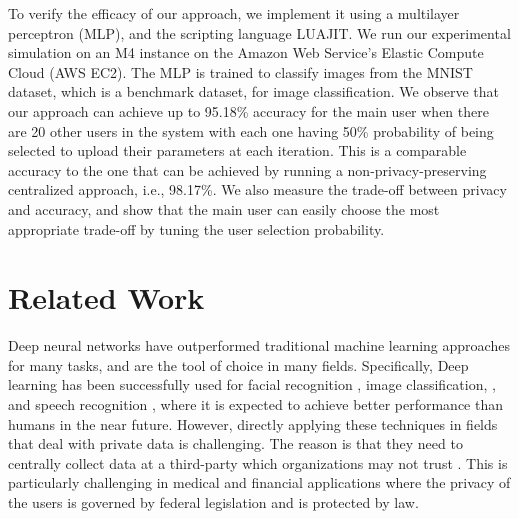 \documentclass[conference]{IEEEtran}
\begin{document}
To verify the efficacy of our approach, we implement it using a multilayer perceptron (MLP), and the scripting language
LUAJIT. We run our experimental simulation on an M4 instance on the Amazon Web Service's Elastic Compute Cloud (AWS EC2). 
The MLP is trained to  classify images from the MNIST dataset, which is a benchmark dataset,  for image classification.
We observe that our approach can achieve up to 95.18\%  accuracy for the main user when there are 20 other users in the
system with each one having 50\% probability of being selected to upload their parameters at each iteration. 
This is a comparable accuracy to the one that can be achieved by running a non-privacy-preserving centralized approach, i.e.,  98.17\%.
We also measure the trade-off between privacy and accuracy, and show that the main user can easily choose the most appropriate
trade-off by tuning the user selection probability. 


\section{Related Work}

Deep neural networks have outperformed traditional machine learning approaches for many tasks, and are the tool of choice in many
fields. Specifically, Deep learning has been successfully used for facial recognition \cite{krizhevsky2012imagenet, sun2014deep, ding2015robust}, image classification, 
\cite{simard2003best, ma2015hyperspectral, zhong2011bilinear}, and speech recognition \cite{hinton2012deep, graves2013speech, noda2015audio}, where it is expected to achieve better
performance than humans in the near future. However, directly applying these techniques in fields that deal with private data is
challenging. The reason is that they need to centrally collect data at a third-party which organizations may not trust
\cite{chicurel2000databasing}. This is particularly challenging in medical and financial applications where the privacy of the users is
governed by federal legislation and is protected by law. 
\end{document}
